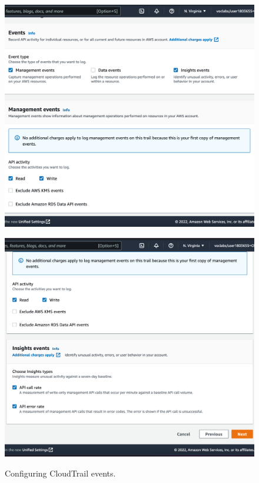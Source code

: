 \begin{figure}[!htbp]
    \centering
    \begin{minipage}{.5\textwidth}
        \centering
        \includegraphics[width=1\linewidth]{resources/cloudtrail/cloudtrail-events-1}
        \label{fig:cloudwatch-events-1}
    \end{minipage}%
    \begin{minipage}{.5\textwidth}
        \centering
        \includegraphics[width=1\linewidth]{resources/cloudtrail/cloudtrail-events-2}
        \label{fig:cloudwatch-events-2}
    \end{minipage}
    \caption{Configuring CloudTrail events.}
    \label{fig:cloudwatch-events}
\end{figure}

